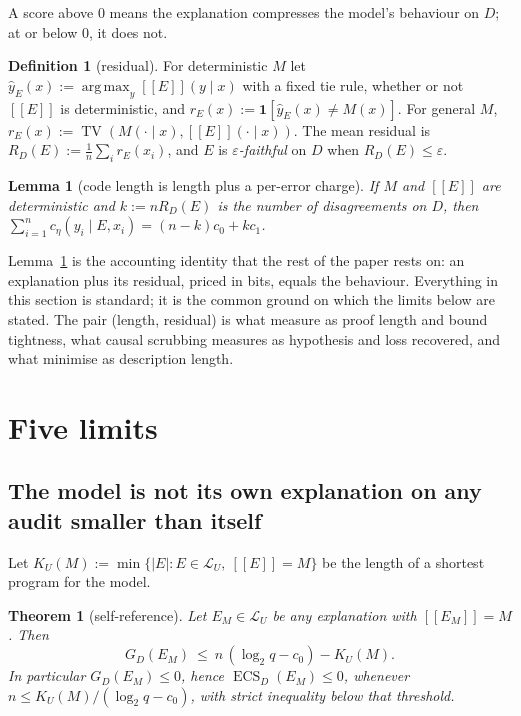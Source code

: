 \documentclass[11pt,letterpaper]{article}
\newcommand{\sem}[1]{[\![#1]\!]}
\newcommand{\Lang}{\mathcal{L}}
\newcommand{\LU}{\Lang_{U}}
\newcommand{\D}{D}
\newcommand{\ind}[1]{\mathbf{1}[#1]}
\DeclareMathOperator{\ECS}{ECS}
\DeclareMathOperator{\TV}{TV}
\DeclareMathOperator*{\argmax}{arg\,max}
\newcommand{\cz}{c_{0}}
\newcommand{\co}{c_{1}}
\newcommand{\Ltwo}{\log_{2}}
\theoremstyle{plain}
\newtheorem{theorem}{Theorem}
\newtheorem{lemma}{Lemma}
\theoremstyle{definition}
\newtheorem{definition}{Definition}
\theoremstyle{remark}
\begin{document}
A score above 0 means the explanation compresses the model's behaviour on $\D$; at or below 0, it does not.

\begin{definition}[residual]
\label{def:residual}
For deterministic $M$ let $\hat y_E(x):=\argmax_{y}\sem{E}(y\mid x)$ with a fixed tie rule, whether or not $\sem{E}$ is deterministic, and $r_E(x):=\ind{\hat y_E(x)\neq M(x)}$. For general $M$, $r_E(x):=\TV(M(\cdot\mid x),\sem{E}(\cdot\mid x))$. The mean residual is $R_{\D}(E):=\frac1n\sum_i r_E(x_i)$, and $E$ is \emph{$\varepsilon$-faithful} on $\D$ when $R_{\D}(E)\le\varepsilon$.
\end{definition}

\begin{lemma}[code length is length plus a per-error charge]
\label{lem:identity}
If $M$ and $\sem{E}$ are deterministic and $k:=nR_{\D}(E)$ is the number of disagreements on $\D$, then
$\sum_{i=1}^{n}c_{\eta}(y_i\mid E,x_i)=(n-k)\cz+k\co$.
\end{lemma}

Lemma~\ref{lem:identity} is the accounting identity that the rest of the paper rests on: an explanation plus its residual, priced in bits, equals the behaviour. Everything in this section is standard; it is the common ground on which the limits below are stated. The pair (length, residual) is what \citet{gross2024} measure as proof length and bound tightness, what causal scrubbing \citep{chan2022scrubbing} measures as hypothesis and loss recovered, and what \citet{ayonrinde2024} minimise as description length.

\section{Five limits}
\label{sec:limits}

\subsection{The model is not its own explanation on any audit smaller than itself}

Let $K_U(M):=\min\{|E|:E\in\LU,\ \sem{E}=M\}$ be the length of a shortest program for the model.

\begin{theorem}[self-reference]
\label{thm:selfref}
Let $E_M\in\LU$ be any explanation with $\sem{E_M}=M$. Then
\begin{equation}
G_{\D}(E_M)\ \le\ n\,(\Ltwo q-\cz)-K_U(M).
\end{equation}
In particular $G_{\D}(E_M)\le 0$, hence $\ECS_{\D}(E_M)\le 0$, whenever $n\le K_U(M)/(\Ltwo q-\cz)$, with strict inequality below that threshold.
\end{theorem}
\end{document}
